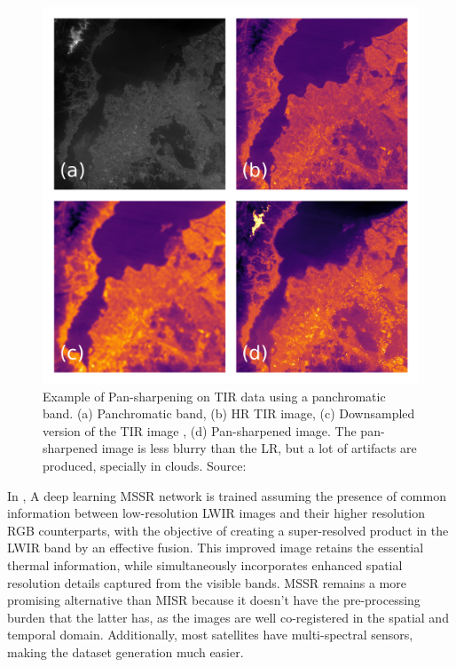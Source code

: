         \begin{figure}[H]
            \centering
            \includegraphics[width=\textwidth]{Includes/2-pansharpen.png}
            \caption{Example of Pan-sharpening on TIR data using a panchromatic band. (a) Panchromatic band, (b) HR TIR image, (c) Downsampled version of the TIR image , (d) Pan-sharpened image. 
            The pan-sharpened image is less blurry than the LR, but a lot of artifacts are produced, specially in clouds. Source: \cite{myself2023}}
            \label{fig:2-pansharpening}
        \end{figure}

        In \cite{myself2023}, A deep learning MSSR network is trained assuming the presence of common information between low-resolution LWIR images and their higher resolution RGB counterparts, with the objective of creating a super-resolved product in the LWIR band by an effective fusion. This improved image retains the essential thermal information, while simultaneously incorporates enhanced spatial resolution details captured from the visible bands. 
        MSSR remains a more promising alternative than MISR because it doesn't have the pre-processing burden that the latter has, as the images are well co-registered in the spatial and temporal domain.
        Additionally, most satellites have multi-spectral sensors, making the dataset generation much easier.

